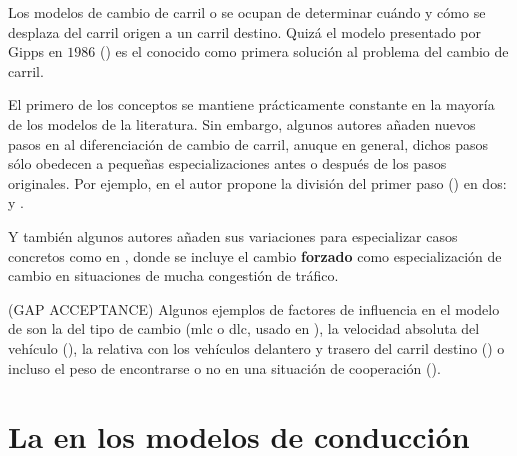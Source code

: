 Los modelos de cambio de carril o \textit{} se ocupan de determinar cuándo y cómo se desplaza del carril origen a un carril destino. Quizá el modelo presentado por Gipps en $1986$ (\cite{Gipps1986}) es el conocido como primera solución al problema del cambio de carril.





El primero de los conceptos se mantiene prácticamente constante en la mayoría de los modelos de la literatura. Sin embargo, algunos autores añaden nuevos pasos en al diferenciación de cambio de carril, anuque en general, dichos pasos sólo obedecen a pequeñas especializaciones antes o después de los pasos originales. Por ejemplo, en \cite{Ahmed1999} el autor propone la división del primer paso (\textit{}) en dos: \textit{} y \textbf{}.

Y también algunos autores añaden sus variaciones para especializar casos concretos como en \cite{Ahmed1999}, donde se incluye el cambio \textbf{forzado} como especialización de cambio en situaciones de mucha congestión de tráfico.




(GAP ACCEPTANCE) Algunos ejemplos de factores de influencia en el modelo de \textit{} son la del tipo de cambio (\gls{mlc} o \gls{dlc}, usado en \cite{Ahmed1999, Toledo2007}), la velocidad absoluta del vehículo (\cite{Gipps1986, Ahmed1996}), la relativa con los vehículos delantero y trasero del carril destino (\cite{Ahmed1999}) o incluso el peso de encontrarse o no en una situación de cooperación (\cite{Ahmed1999, Hidas2002}).


\section{La  en los modelos de conducción}

